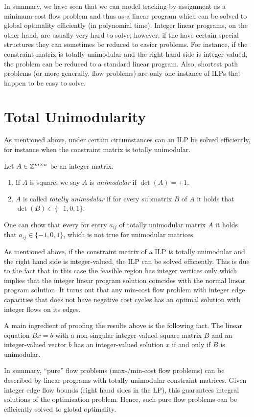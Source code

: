 In summary, we have seen that we can model tracking-by-assignment as a
minimum-cost flow problem and thus as a linear program which can be solved to
global optimality efficiently (in polynomial time). Integer linear programs, on
the other hand, are usually very hard to solve; however, if the have certain
special structures they can sometimes be reduced to easier problems. For
instance, if the constraint matrix is totally unimodular and the right hand side
is integer-valued, the problem can be reduced to a standard linear
program. Also, shortest path problems (or more generally, flow problems) are
only one instance of ILPs that happen to be easy to solve.

\section{Total Unimodularity}
As mentioned above, under certain circumstances can an ILP be solved
efficiently, for instance when the constraint matrix is totally unimodular.
\begin{definition}
  Let $A \in \mathbb{Z}^{m \times n}$ be an integer matrix.
  \begin{enumerate}[label=(\alph*)]
  \item If $A$ is square, we say $A$ is \emph{unimodular} if $\det(A) = \pm 1$.
  \item $A$ is called \emph{totally unimodular} if for every submatrix $B$ of
    $A$ it holds that $\det(B) \in \{-1,0,1\}$.
  \end{enumerate}
  One can show that every for entry $a_{ij}$ of totally unimodular matrix $A$ it
  holds that $a_{ij} \in \{-1,0,1\}$, which is not true for unimodular matrices.
\end{definition}

As mentioned above, if the constraint matrix of a ILP is totally unimodular and
the right hand side is integer-valued, the ILP can be solved efficiently. This
is due to the fact that in this case the feasible region has integer vertices
only which implies that the integer linear program solution coincides with the
normal linear program solution. It turns out that any min-cost flow problem with
integer edge capacities that does not have negative cost cycles has an optimal
solution with integer flows on its edges.

A main ingredient of proofing the results above is the following fact. The
linear equation $Bx = b$ with a non-singular integer-valued square matrix $B$
and an integer-valued vector $b$ has an integer-valued solution $x$ if and only
if $B$ is unimodular.

In summary, ``pure'' flow problems (max-/min-cost flow problems) can be
described by linear programs with totally unimodular constraint matrices.  Given
integer edge flow bounds (right hand sides in the LP), this guarantees integral
solutions of the optimisation problem. Hence, such pure flow problems can be
efficiently solved to global optimality.

